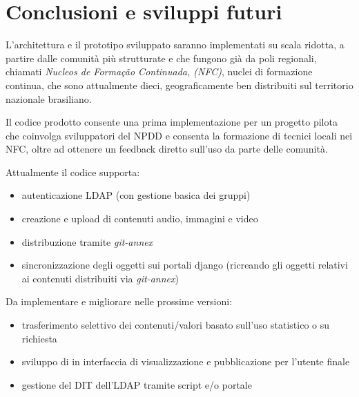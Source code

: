 
\chapter{Conclusioni e sviluppi futuri}
\label{Capitolo5}

L'architettura e il prototipo sviluppato saranno implementati su scala
ridotta, a partire dalle comunità più strutturate e che fungono già da
poli regionali, chiamati \emph{Nucleos de Formação Continuada, (NFC)},
nuclei di formazione continua, che sono attualmente dieci,
geograficamente ben distribuiti sul territorio nazionale brasiliano.

Il codice prodotto consente una prima implementazione per un progetto
pilota che coinvolga sviluppatori del NPDD e consenta la formazione di
tecnici locali nei NFC, oltre ad ottenere un feedback diretto sull'uso
da parte delle comunità.

Attualmente il codice supporta:
\begin{itemize}
\item autenticazione LDAP (con gestione basica dei gruppi)
\item creazione e upload di contenuti audio, immagini e video
\item distribuzione tramite \emph{git-annex}
\item sincronizzazione degli oggetti sui portali django (ricreando gli
  oggetti relativi ai contenuti distribuiti via \emph{git-annex})
\end{itemize}

Da implementare e migliorare nelle prossime versioni:
\begin{itemize}
\item trasferimento selettivo dei contenuti/valori basato sull'uso
  statistico o su richiesta
\item sviluppo di in interfaccia di visualizzazione e pubblicazione
  per l'utente finale
\item gestione del DIT dell'LDAP tramite script e/o portale
\end{itemize}

